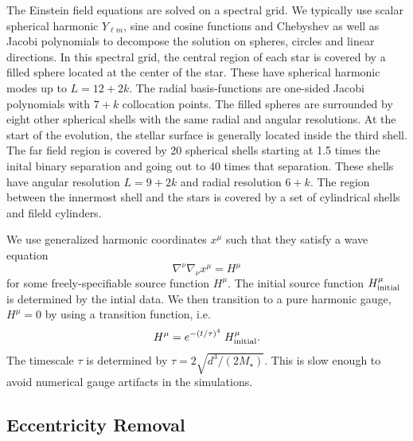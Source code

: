 \documentclass[aps,prd,amsmath,floatfix
,twocolumn
,superscriptaddress,nofootinbib,showpacs]{revtex4-1}
\theoremstyle{plain} \newtheorem{thm}{Theorem} \newtheorem{lem}{Lemma}
\newcommand{\red}[1]{\textcolor{Red}{#1}}
\begin{document}
The Einstein field equations are solved on a spectral grid. We typically use
scalar spherical harmonic $Y_{\ell m}$, sine and cosine functions and
Chebyshev as well as Jacobi polynomials to decompose the solution on spheres,
circles and linear directions. In this
spectral grid, the central region of each star is covered by a filled sphere
located at
the center of the star. These have spherical harmonic modes up to
$L = 12+2k$.  The radial basis-functions are one-sided Jacobi
polynomials with $7+k$ collocation points. The filled spheres are
surrounded by eight other spherical shells with the same radial and
angular resolutions. At the start of the evolution,
  the stellar surface is generally located inside the third shell.
The far field region is covered by 20 spherical shells starting at 1.5
times the inital binary separation and going out to 40 times that
separation. These shells have angular resolution $L=9+2k$ and radial
resolution $6+k$.  The region between the innermost shell and the
stars is covered by a set of cylindrical shells and fileld cylinders.

We use generalized harmonic coordinates $x^{\mu}$ such that they satisfy a
wave equation
\begin{equation}
\nabla^{\nu}\nabla_{\nu}x^{\mu} = H^{\mu}
\end{equation}
for some freely-specifiable source function $H^{\mu}$. The initial source function $H^\mu_{\rm initial}$ is determined by the intial data. We then transition to a pure harmonic gauge, $H^{\mu}=0$ by using a transition function, i.e.
\begin{equation}
H^\mu = e^{-\left(t/\tau\right)^4}\; H^\mu_{\rm initial}.
\end{equation}
The timescale $\tau$ is determined by $\tau=2\sqrt{d^3/(2M_\star)}$.
This is slow enough to avoid numerical gauge artifacts in the simulations.

\subsection{Eccentricity Removal}
\label{sec:EccRemoval}
\end{document}
